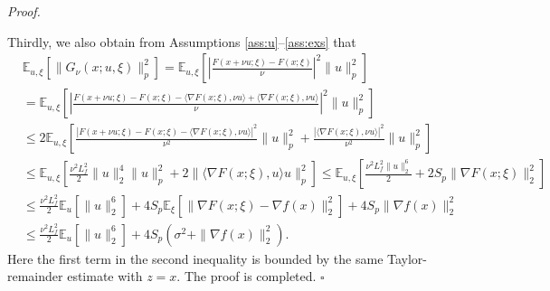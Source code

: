 \documentclass[11pt]{article}
\newenvironment{proof}[1][Proof]{%
    \par\noindent\textit{#1.}\enspace
  }{%
    \hfill\ensuremath{\square}\par
  }%
\numberwithin{equation}{section}
\newcommand{\E}{\mathbb{E}}
\begin{document}
\begin{proof}
    Thirdly, we also obtain from Assumptions \ref{ass:u}--\ref{ass:exs} that \begin{align*}
            &\E_{u,\xi} [\|G_\nu(x;u,\xi)\|_p^2] = \E_{u,\xi} [|\frac{F(x+\nu u;\xi)-F(x;\xi)}{\nu}|^2 \|u\|_p^2] \\
            & =  \E_{u,\xi} [|\frac{F(x+\nu u;\xi)-F(x;\xi)-\langle \nabla F(x;\xi), \nu u\rangle + \langle \nabla F(x;\xi), \nu u\rangle}{\nu}|^2\|u\|_p^2] \\
             & \le 2\E_{u,\xi} [ \frac{|F(x+\nu u;\xi)-F(x;\xi)-\langle \nabla F(x;\xi), \nu u\rangle |^2}{\nu^2}\|u\|_p^2 + \frac{| \langle \nabla F(x;\xi), \nu u\rangle|^2}{\nu^2}\|u\|_p^2] \\
             & \leq \E_{u,\xi} [\frac{\nu^2L_f^2}{2}\|u\|_2^4\|u\|_p^2 + 2\|\langle \nabla F(x;\xi),u\rangle u \|_p^2]  \leq  \E_{u,\xi} [\frac{\nu^2L_f^2 \| u\|_2^6}{2} + 2S_p\|\nabla F(x;\xi)\|_2^2 ] \\
             & \leq \frac{\nu^2L_f^2}{2}\E_u [\|u\|_2^6] + 4S_p\E_\xi [\|\nabla F(x;\xi)-\nabla f(x)\|_2^2]  + 4S_p\|\nabla f(x)\|_2^2 \\
             & \leq \frac{\nu^2L_f^2}{2}\E_u [\|u\|_2^6] + 4S_p(\sigma^2 + \|\nabla f(x)\|_2^2) .
    \end{align*}
    Here the first term in the second inequality is bounded by the same Taylor-remainder estimate with $z=x$.
    The proof is completed. 
\end{proof}
\end{document}
